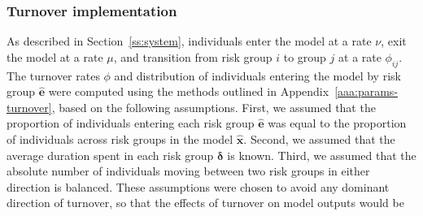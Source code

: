 \subsubsection{Turnover implementation}
As described in Section~\ref{ss:system}, individuals
enter the model at a rate $\nu$,
exit the model at a rate $\mu$,
and transition from risk group $i$ to group $j$ at a rate $\phi_{ij}$.
The turnover rates $\phi$ and
distribution of individuals entering the model by risk group $\bm{\hat{e}}$
were computed using the methods outlined in
Appendix~\ref{aaa:params-turnover}, based on the following assumptions.
First, we assumed that
the proportion of individuals entering each risk group $\bm{\hat{e}}$
was equal to the proportion of individuals across risk groups in the model $\bm{\hat{x}}$.
Second, we assumed that
the average duration spent in each risk group $\bm{\delta}$ is known.
Third, we assumed that
the absolute number of individuals moving between two risk groups in either direction is balanced.
These assumptions were chosen to avoid any dominant direction of turnover,
so that the effects of turnover on model outputs would be
